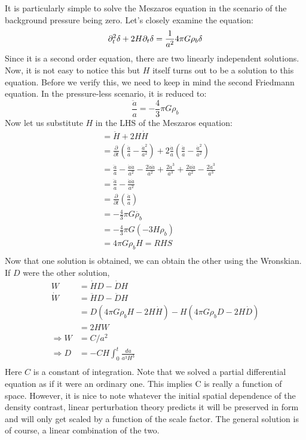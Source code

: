 \documentclass[12pt,a4paper,oneside]{book}
\def\pa{{\partial}}
\begin{document}
				It is particularly simple to solve the Meszaros equation in the scenario of the background pressure being zero. Let's closely examine the equation:
				$$
					\pa_t^2\delta+2H\pa_t\delta=\frac{1}{a^2}4\pi G\rho_b\delta\\
				$$
				Since it is a second order equation, there are two linearly independent solutions. Now, it is not easy to notice this but $H$ itself turns out to be a solution to this equation. Before we verify this, we need to keep in mind the second Friedmann equation. In the pressure-less scenario, it is reduced to:
				$$
					\frac{\ddot{a}}{a}=-\frac{4}{3}\pi G\rho_b
				$$
				Now let us substitute $H$ in the LHS of the Meszaros equation:
				$$
				\begin{aligned}
					&=\ddot{H}+2H\dot{H}\\
					&=\frac{\pa}{\pa t}\left(\frac{\ddot{a}}{a}-\frac{\dot{a}^2}{a^2}\right)+2\frac{\dot{a}}{a}\left(\frac{\ddot{a}}{a}-\frac{\dot{a}^2}{a^2}\right)\\
					&=\frac{\dddot{a}}{a}-\frac{\ddot{a}\dot{a}}{a^2}-\frac{2\dot{a}\ddot{a}}{a^2}+\frac{2\dot{a}^3}{a^3}+\frac{2\dot{a}\ddot{a}}{a^2}-\frac{2\dot{a}^3}{a^3}\\
					&=\frac{\dddot{a}}{a}-\frac{\ddot{a}\dot{a}}{a^2}\\
					&=\frac{\pa }{\pa t}\left(\frac{\ddot{a}}{a}\right)\\
					&=-\frac{4}{3}\pi G\dot{\rho_b}\\
					&=-\frac{4}{3}\pi G(-3H\rho_b)\\
					&=4\pi G \rho_b H=RHS\\
				\end{aligned}
				$$
				Now that one solution is obtained, we can obtain the other using the Wronskian. If $D$ were the other solution,
				$$
				\begin{aligned}
					W&=\dot{H}D-\dot{D}H\\
					\dot{W}&=\ddot{H}D-\ddot{D}H\\
					&=D(4\pi G\rho_bH-2H\dot{H})-H(4\pi G\rho_bD-2H\dot{D})\\
					&=2HW\\
					\Rightarrow W&=C/a^2\\
					\Rightarrow D&=-CH\int_{0}^{t}\frac{da}{a^3H^3}\\
				\end{aligned}
				$$
				Here $C$ is a constant of integration. Note that we solved a partial differential equation as if it were an ordinary one. This implies C is really a function of space. However, it is nice to note whatever the initial spatial dependence of the density contrast, linear perturbation theory predicts it will be preserved in form and will only get scaled by a function of the scale factor. The general solution is of course, a linear combination of the two. 
\end{document}
